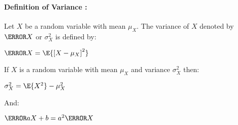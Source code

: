 \paragraph{Definition of Variance :}
Let $X$ be a random variable with mean $\mu_{X}$. The variance of $X$ 
denoted by $\V{X}$ or $\sigma_{X}^{2}$ is defined by:
\begin{center}
	$\V{X}=\E{\left[ X-\mu_{X} \right]^{2}}$
\end{center}
If $X$ is a random variable with mean $\mu_{X}$ and variance $\sigma_{X}^{2}$ then:
\begin{center}
$\sigma_{X}^{2}=\E{X^{2}}-\mu_{X}^{2}$
\end{center}
And:
\begin{center}
	$\V{aX+b}=a^{2}\V{X}$
\end{center}
